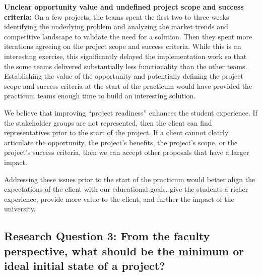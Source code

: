 \documentclass[conference]{IEEEtran}
\begin{document}
\textbf{Unclear opportunity value and undefined project scope and success
criteria:} On a few projects, the teams spent the first two to three
weeks identifying the underlying problem and
analyzing the market trends and competitive landscape to validate the
need for a solution. Then they spent more iterations agreeing on the
project scope and success criteria. While this is an interesting
exercise, this significantly delayed the implementation work so that
the some teams delivered substantially less functionality than the other
teams. Establishing the value of the opportunity and potentially
defining the project scope and success criteria at the start of the
practicum would have provided the practicum teams enough time to
build an interesting solution.

We believe that improving ``project readiness'' enhances the student
experience. If the stakeholder groups are not represented, then the
client can find representatives prior to the start of the project. If a
client cannot clearly articulate the opportunity, the project's
benefits, the project's scope, or the project's success criteria, then
we can accept other proposals that have a larger impact.

Addressing these issues prior to the start of the practicum would
better align the expectations of the client with our educational goals,
give the students a richer experience, provide more value to the client,
and further the impact of the university.

\subsection{Research Question 3: From the faculty perspective, what should be the minimum or ideal initial state of a project?}
\end{document}
